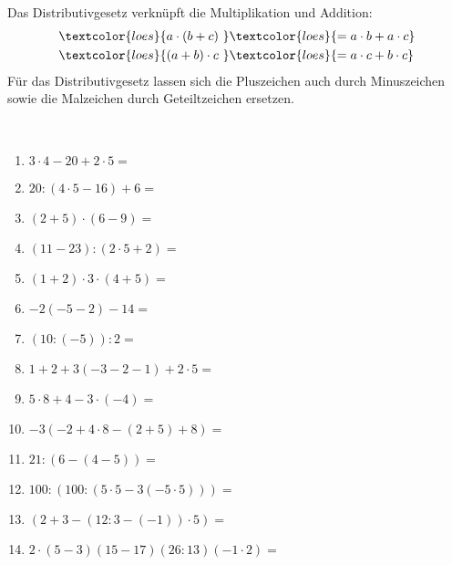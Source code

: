 Das Distributivgesetz verknüpft die Multiplikation und Addition:
\begin{align*}
	\textcolor{loes}{a\cdot\left( b+c\right)\ }&\textcolor{loes}{=a\cdot b+a\cdot c}\\
	\textcolor{loes}{\left( a+b\right) \cdot c\ }&\textcolor{loes}{=a\cdot c+b\cdot c }
\end{align*}
Für das Distributivgesetz lassen sich die Pluszeichen auch durch Minuszeichen sowie die Malzeichen durch Geteiltzeichen ersetzen.
\newpage
\begin{Exercise}[title={Berechne die folgenden Ausdrücke}, label=einfachesRechnenA1]\\
	\begin{minipage}{\textwidth}
		\begin{minipage}{0.49\textwidth}
			\begin{enumerate}[label=\alph*)]
				\item \(3\cdot 4-20+2\cdot 5=\)
				\item \(20:\left( 4\cdot 5-16\right) +6=\)
				\item \(\left( 2+5\right) \cdot \left( 6-9\right) =\)
				\item \(\left( 11-23\right) :\left( 2\cdot 5+2\right) =\)
				\item \(\left( 1+2\right) \cdot3\cdot\left( 4+5\right) =\)
				\item \(-2\left( -5-2\right) -14=\)
				\item \(\left( 10:\left( -5\right)\right)  :2=\)
				\item \(1+2+3\left( -3-2-1\right) +2\cdot 5=\)
				\item \(5\cdot 8+4-3\cdot \left( -4\right) =\)
				\item \(-3\left( -2+4\cdot 8-\left( 2+5\right) +8\right) =\)
				\item \(21:\left( 6-\left( 4-5\right) \right) =\)
				\item \(100:\left( 100:\left( 5\cdot 5-3\left( -5\cdot 5\right) \right) \right) =\)
				\item \(\left( 2+3-\left( 12:3-\left( -1\right) \right)\cdot 5 \right) =\)
			\end{enumerate}
		\end{minipage}
		\begin{minipage}{0.49\textwidth}
			\begin{enumerate}[label=\alph*)]
				\setcounter{enumi}{13}
				\item \(2\cdot\left(5-3\right) \left( 15-17\right) \left( 26:13\right) \left( -1\cdot 2\right) = \)

\end{enumerate}
\end{minipage}
\end{minipage}
\end{Exercise}
